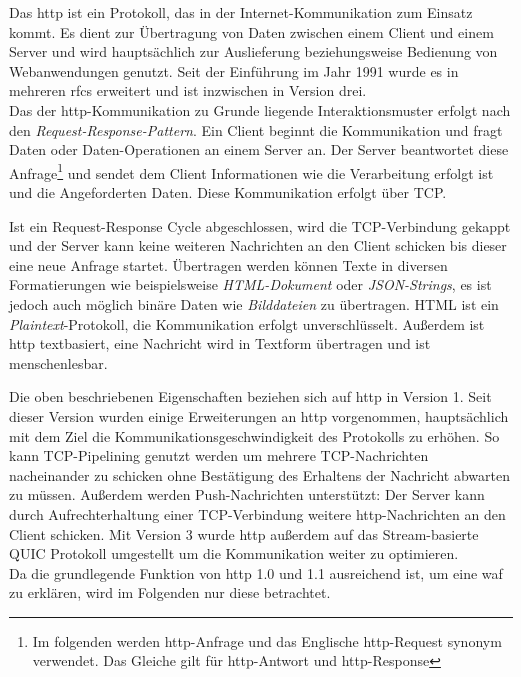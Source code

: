 Das \ac{http} ist ein Protokoll, das in der Internet-Kommunikation zum Einsatz kommt.
Es dient zur Übertragung von Daten zwischen einem Client und einem Server und wird hauptsächlich zur Auslieferung beziehungsweise Bedienung von Webanwendungen genutzt.
Seit der Einführung im Jahr 1991 wurde es in mehreren \acp{rfc} erweitert und ist inzwischen in Version drei\cite{onlineIETFErhebtHTTP2022}.\\

Das der \ac{http}-Kommunikation zu Grunde liegende Interaktionsmuster erfolgt nach den \textit{Request-Response-Pattern}.
Ein Client beginnt die Kommunikation und fragt Daten oder Daten-Operationen an einem Server an.
Der Server beantwortet diese Anfrage\footnote{Im folgenden werden \ac{http}-Anfrage und das Englische \ac{http}-Request synonym verwendet. Das Gleiche gilt für \ac{http}-Antwort und \ac{http}-Response} und sendet dem Client Informationen wie die Verarbeitung erfolgt ist und die Angeforderten Daten.
Diese Kommunikation erfolgt über TCP.

Ist ein Request-Response Cycle abgeschlossen, wird die TCP-Verbindung gekappt und der Server kann keine weiteren Nachrichten an den Client schicken bis dieser eine neue Anfrage startet.
Übertragen werden können Texte in diversen Formatierungen wie beispielsweise \textit{HTML-Dokument} oder \textit{JSON-Strings}, es ist jedoch auch möglich binäre Daten wie \textit{Bilddateien} zu übertragen.
HTML ist ein \textit{Plaintext}-Protokoll, die Kommunikation erfolgt unverschlüsselt.
Außerdem ist \ac{http} textbasiert, eine Nachricht wird in Textform übertragen und ist menschenlesbar.

Die oben beschriebenen Eigenschaften beziehen sich auf \ac{http} in Version 1.
Seit dieser Version wurden einige Erweiterungen an \ac{http} vorgenommen, hauptsächlich mit dem Ziel die Kommunikationsgeschwindigkeit des Protokolls zu erhöhen.
So kann TCP-Pipelining genutzt werden um mehrere TCP-Nachrichten nacheinander zu schicken ohne Bestätigung des Erhaltens der Nachricht abwarten zu müssen.
Außerdem werden Push-Nachrichten unterstützt:
Der Server kann durch Aufrechterhaltung einer TCP-Verbindung weitere \ac{http}-Nachrichten an den Client schicken.
Mit Version 3 wurde \ac{http} außerdem auf das Stream-basierte QUIC Protokoll umgestellt um die Kommunikation weiter zu optimieren\cite{OverviewHTTPHTTP2023}.\\

Da die grundlegende Funktion von \ac{http} 1.0 und 1.1 ausreichend ist, um eine \ac{waf} zu erklären, wird im Folgenden nur diese betrachtet.

